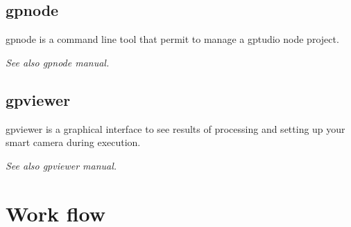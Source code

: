 \subsection{gpnode}
gpnode is a command line tool that permit to manage a gptudio node project.

\emph{See also gpnode manual.}

\subsection{gpviewer}
gpviewer is a graphical interface to see results of processing and setting up your smart camera during execution.

\emph{See also gpviewer manual.}

\section{Work flow}
